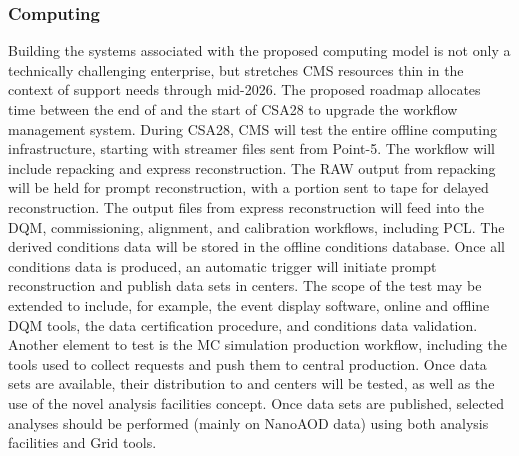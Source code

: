 \subsubsection{Computing}
Building the systems associated with the proposed \PhaseTwo computing model is not only a technically challenging enterprise, but stretches CMS resources thin in the context of \RunThree support needs through mid-2026. The proposed roadmap allocates time between the end of \RunThree and the start of CSA28 to upgrade the workflow management system. 
During CSA28, CMS will test the entire offline computing infrastructure, starting with streamer files sent from Point-5. The workflow will include repacking and express reconstruction. The \gls{RAW} output from repacking will be held for prompt reconstruction, with a portion sent to tape for delayed reconstruction. The output files from express reconstruction will feed into the \gls{DQM}, commissioning, alignment, and calibration workflows, including \gls{PCL}. The derived conditions data will be stored in the offline conditions database. Once all conditions data is produced, an automatic trigger will initiate prompt reconstruction and publish data sets in \TierOne centers. The scope of the test may be extended to include, for example, the event display software, online and offline \gls{DQM} tools, the data certification procedure, and conditions data validation. 
Another element to test is the \gls{MC} simulation production workflow, including the tools used to collect requests and push them to central production. Once data sets are available, their distribution to \TierOne and \TierTwo centers will be tested, as well as the use of the novel analysis facilities concept. Once data sets are published, selected analyses should be performed (mainly on NanoAOD data) using both analysis facilities and Grid tools.

